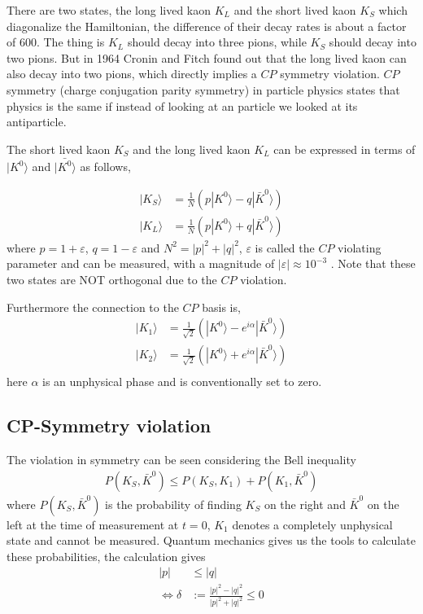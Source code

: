 \documentclass[a4paper]{article}
\begin{document}
There are two states, the long lived kaon $K_L$ and the short lived kaon $K_S$
which diagonalize the Hamiltonian,
the difference of their decay rates is about a factor of $600$.
The thing is $K_L$ should decay into three pions, while $K_S$ should decay
into two pions. But in 1964 Cronin and Fitch found out that the long lived
kaon can also decay into two pions, which directly implies a $CP$ symmetry violation.
$CP$ symmetry (charge conjugation parity symmetry) in particle physics states
that physics is the same if instead of looking at an particle we looked at its
antiparticle.

The short lived kaon $K_S$ and the long lived kaon $K_L$ can be expressed in
terms of $|K^0\rangle$ and $|\bar{K^0}\rangle$ as follows,

\begin{align}
    |K_S\rangle &=  \frac{1}{N}(p|K^0\rangle - q|\bar{K}^0\rangle) \\
    |K_L\rangle &=  \frac{1}{N}(p|K^0\rangle + q|\bar{K}^0\rangle)
\end{align}
where $p = 1+\varepsilon$, $q=1-\varepsilon$ and $N^2 = |p|^2 + |q|^2$,
$\varepsilon$ is called the $CP$ violating parameter and can be measured, with
a magnitude of $|\varepsilon| \approx 10^{-3}$ \cite{Bertlmann} . Note
that these two states are NOT orthogonal due to the $CP$ violation.


Furthermore the connection to the $CP$ basis is,
\begin{align}
    |K_1\rangle &=  \frac{1}{\sqrt{2}}(|K^0\rangle - e^{i\alpha}|\bar{K}^0\rangle) \\
    |K_2\rangle &=  \frac{1}{\sqrt{2}}(|K^0\rangle + e^{i\alpha}|\bar{K}^0\rangle) \\
\end{align}
here $\alpha$ is an unphysical phase and is conventionally set to zero.


\subsection{CP-Symmetry violation}
The violation in symmetry can be seen considering the Bell inequality
\begin{align}\label{eq:leqk}
    P(K_S, \bar{K}^0) \leq P(K_S, K_1) + P(K_1, \bar{K}^0)
\end{align}
where $P(K_S, \bar{K}^0)$ is the probability of finding $K_S$ on the right and
$\bar{K}^0$ on the left at the time of measurement at $t=0$, $K_1$ denotes a
completely unphysical state and cannot be measured. Quantum mechanics gives us
the tools to calculate these probabilities, the calculation gives
\begin{align}
    |p|&\leq |q|\\
    \Leftrightarrow \delta &:= \frac{|p|^2 - |q|^2}{|p|^2+|q|^2} \leq 0
\end{align}
\end{document}
